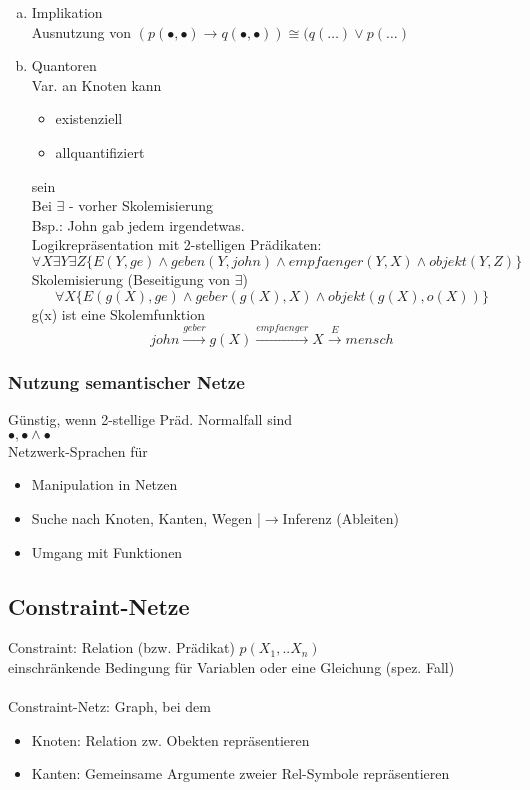 \documentclass[a4paper,14pt]{article}
\begin{document}
\begin{enumerate}[(a)]
\item	Implikation\\
	Ausnutzung von $(p(\bullet,\bullet)\to q(\bullet,\bullet))\cong (q(\dots)\vee p(\dots)$

\item	Quantoren\\
	Var. an Knoten kann
	\begin{itemize}
	 \item existenziell
	 \item allquantifiziert
	\end{itemize}
	sein\\
	Bei \glqq$\exists$\grqq{} - vorher Skolemisierung\\
	Bsp.: \glqq{}John gab jedem irgendetwas.\grqq{}\\
	Logikrepräsentation mit 2-stelligen Prädikaten:
	\begin{equation}
	 \forall X \exists Y \exists Z \{ E(Y,ge) \wedge geben(Y,john) \wedge empfaenger(Y,X) \wedge objekt(Y,Z)\}
	\end{equation}
	Skolemisierung (Beseitigung von \glqq$\exists$\grqq{})
	\begin{equation}
	 \forall X \{ E(g(X),ge)\wedge geber(g(X),X) \wedge objekt(g(X),o(X))\}
	\end{equation}
	g(x) ist eine Skolemfunktion
	\begin{equation}
	 john \xrightarrow{geber}g(X)\xrightarrow{empfaenger}X\xrightarrow{E}mensch
	\end{equation}
\end{enumerate}

\subsubsection{Nutzung semantischer Netze}
Günstig, wenn 2-stellige Präd. Normalfall sind\\
$\bullet,\bullet \wedge \bullet$\\
Netzwerk-Sprachen für 
\begin{itemize}
 \item Manipulation in Netzen
 \item Suche nach Knoten, Kanten, Wegen |$\to$Inferenz (Ableiten)
 \item Umgang mit Funktionen
\end{itemize}

\subsection{Constraint-Netze}
Constraint: Relation (bzw. Prädikat) $p(X_1,..X_n)$ \\
einschränkende Bedingung für Variablen oder eine Gleichung (spez. Fall)\\
\\
Constraint-Netz: Graph, bei dem
\begin{itemize}
 \item Knoten: Relation zw. Obekten repräsentieren
 \item Kanten: Gemeinsame Argumente zweier Rel-Symbole repräsentieren
\end{itemize}
\end{document}
